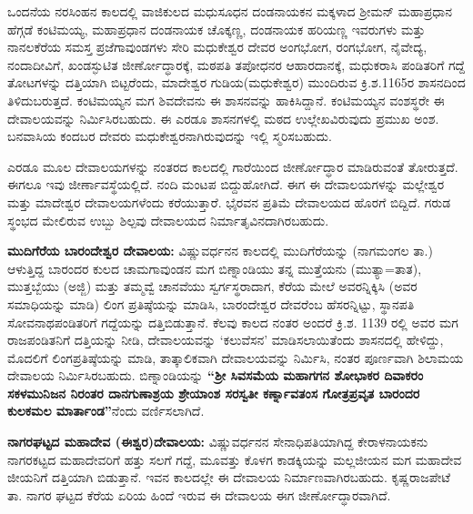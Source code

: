 \vskip 3pt

ಒಂದನೆಯ ನರಸಿಂಹನ ಕಾಲದಲ್ಲಿ ವಾಜಿಕುಲದ ಮಧುಸೂಧನ ದಂಡನಾಯಕನ ಮಕ್ಕಳಾದ ಶ‍್ರೀಮನ್​ ಮಹಾಪ್ರಧಾನ ಹೆಗ್ಗಡೆ ಕಂಟಿಮಯ್ಯ, ಮಹಾಪ್ರಧಾನ ದಂಡನಾಯಕ ಚೊಕ್ಕಣ್ಣ, ದಂಡನಾಯಕ ಹರಿಯಣ್ಣ ಇವರುಗಳು ಮತ್ತು ನಾನಲಕೆರೆಯ ಸಮಸ್ತ ಪ್ರಜೆಗಾವುಂಡಗಳು ಸೇರಿ ಮಧುಕೇಶ್ವರ ದೇವರ ಅಂಗಭೋಗ, ರಂಗಭೋಗ, ನೈವೇದ್ಯ, ನಂದಾದೀವಿಗೆ, ಖಂಡಸ್ಫುಟಿತ ಜೀರ್ಣೋದ್ಧಾರಕ್ಕೆ, ಮಠಪತಿ ತಪೋಧನರ ಆಹಾರದಾನಕ್ಕೆ, ಮಧುಕರಾಸಿ ಪಂಡಿತರಿಗೆ ಗದ್ದೆ ತೋಟಗಳನ್ನು ದತ್ತಿಯಾಗಿ ಬಿಟ್ಟರೆಂದು, ಮಾದೇಶ್ವರ ಗುಡಿಯ(ಮಧುಕೇಶ್ವರ) ಮುಂದಿರುವ ಕ್ರಿ.ಶ.1165ರ ಶಾಸನದಿಂದ ತಿಳಿದುಬರುತ್ತದೆ. ಕಂಟಿಮಯ್ಯನ ಮಗ ಶಿವದೇವನು ಈ ಶಾಸನವನ್ನು ಹಾಕಿಸಿದ್ದಾನೆ. ಕಂಟಿಮಯ್ಯನ ವಂಶಸ್ಥರೇ ಈ ದೇವಾಲಯವನ್ನು ನಿರ್ಮಿಸಿರಬಹುದು. ಈ ಎರಡೂ ಶಾಸನಗಳಲ್ಲಿ ಮಠದ ಉಲ್ಲೇಖವಿರುವುದು ಪ್ರಮುಖ ಅಂಶ. ಬನವಾಸಿಯ ಕಂದಬರ ದೇವರು ಮಧುಕೇಶ್ವರನಾಗಿರುವುದನ್ನು ಇಲ್ಲಿ ಸ್ಮರಿಸಬಹುದು.

\vskip 3pt

ಎರಡೂ ಮೂಲ ದೇವಾಲಯಗಳನ್ನು ನಂತರದ ಕಾಲದಲ್ಲಿ ಗಾರೆಯಿಂದ ಜೀರ್ಣೋದ್ಧಾರ ಮಾಡಿರುವಂತೆ ತೋರುತ್ತದೆ. ಈಗಲೂ ಇವು ಜೀರ್ಣಾವಸ್ಥೆಯಲ್ಲಿದೆ. ನಂದಿ ಮಂಟಪ ಬಿದ್ದುಹೋಗಿದೆ. ಈಗ ಈ ದೇವಾಲಯಗಳನ್ನು ಮಲ್ಲೇಶ್ವರ ಮತ್ತು ಮಾದೇಶ್ವರ ದೇವಾಲಯಗಳೆಂದು ಕರೆಯುತ್ತಾರೆ. ಭೈರವನ ಪ್ರತಿಮೆ ದೇವಾಲಯದ ಹೊರಗೆ ಬಿದ್ದಿದೆ. ಗರುಡ ಸ್ಥಂಭದ ಮೇಲಿರುವ ಉಬ್ಬು ಶಿಲ್ಪವು ದೇವಾಲಯದ ನಿರ್ಮಾತೃವಿನದಾಗಿರಬಹುದು.

\newpage

\textbf{ಮುದಿಗೆರೆಯ ಬಾರಂದೇಶ್ವರ ದೇವಾಲಯ:} ವಿಷ್ಣುವರ್ಧನನ ಕಾಲದಲ್ಲಿ ಮುದಿಗೆರೆಯನ್ನು (ನಾಗಮಂಗಲ ತಾ.) ಆಳುತ್ತಿದ್ದ ಬಾರಂದರ ಕುಲದ ಚಾಮಗಾವುಂಡನ ಮಗ ಬಿಣ್ನಾಂಡಿಯು ತನ್ನ ಮುತ್ತೆಯನು (ಮುತ್ಯಾ=ತಾತ), ಮುತ್ತಬ್ಬೆಯು (ಅಜ್ಜಿ) ಮತ್ತು ತಮ್ಮವ್ವೆ ಚಾನವೆಯು ಸ್ವರ್ಗಸ್ಥರಾದಾಗ, ಕೆರೆಯ ಮೇಲೆ ಅವರನ್ನಿಕ್ಕಿಸಿ (ಅವರ ಸಮಾಧಿಯನ್ನು ಮಾಡಿ) ಲಿಂಗ ಪ್ರತಿಷ್ಠೆಯನ್ನು ಮಾಡಿಸಿ, ಬಾರಂದೇಶ್ವರ ದೇವರೆಂಬ ಹೆಸರನ್ನಿಟ್ಟು, ಸ್ಥಾನಪತಿ ಸೋವನಾಥಪಂಡಿತರಿಗೆ ಗದ್ದೆಯನ್ನು ದತ್ತಿಬಿಡುತ್ತಾನೆ. ಕೆಲವು ಕಾಲದ ನಂತರ ಅಂದರೆ ಕ್ರಿ.ಶ. 1139 ರಲ್ಲಿ ಅವರ ಮಗ ರಾಜಪಂಡಿತನಿಗೆ ದತ್ತಿಯನ್ನು ನೀಡಿ, ದೇವಾಲಯವನ್ನು ‘ಕಲುವೆಸನ’ ಮಾಡಿಸಲಾಯಿತೆಂದು ಶಾಸನದಲ್ಲಿ ಹೇಳಿದ್ದು, ಮೊದಲಿಗೆ ಲಿಂಗಪ್ರತಿಷ್ಠೆಯನ್ನು ಮಾಡಿ, ತಾತ್ಕಾಲಿಕವಾಗಿ ದೇವಾಲಯವನ್ನು ನಿರ್ಮಿಸಿ, ನಂತರ ಪೂರ್ಣವಾಗಿ ಶಿಲಾಮಯ ದೇವಾಲಯ ನಿರ್ಮಿಸಿರಬಹುದು. ಬಿಣ್ನಾಂಡಿಯನ್ನು \textbf{“ಶ‍್ರೀ ಸಿವಸಮೆಯ ಮಹಾಗಗನ ಶೋಭಾಕರ ದಿವಾಕರಂ ಸಕಳಮುನಿಜನ ನಿರಂತರ ದಾನಗುಣಾಶ್ರಯ ಶ್ರೇಯಾಂಶ ಸರಸ್ವತೀ ಕರ್ಣ್ನಾವತಂಸ ಗೋತ್ರಪ್ರವೃತ ಬಾರಂದರ ಕುಲಕಮಲ ಮಾರ್ತಾಂಡ”}ನೆಂದು ವರ್ಣಿಸಲಾಗಿದೆ.

\textbf{ನಾಗರಘಟ್ಟದ ಮಹಾದೇವ (ಈಶ್ವರ)ದೇವಾಲಯ:} ವಿಷ್ಣುವರ್ಧನನ ಸೇನಾಧಿಪತಿಯಾಗಿದ್ದ ಕೇರಾಳನಾಯಕನು ನಾಗರಕಟ್ಟದ ಮಹಾದೇವರಿಗೆ ಹತ್ತು ಸಲಗೆ ಗದ್ದೆ, ಮೂವತ್ತು ಕೊಳಗ ಕಾಡಕ್ಕಿಯನ್ನು ಮಲ್ಲಜೀಯನ ಮಗ ಮಹಾದೇವ ಜೀಯನಿಗೆ ದತ್ತಿಯಾಗಿ ಬಿಡುತ್ತಾನೆ. ಇವನ ಕಾಲದಲ್ಲೇ ಈ ದೇವಾಲಯ ನಿರ್ಮಾಣವಾಗಿರಬಹುದು. ಕೃಷ್ಣರಾಜಪೇಟೆ ತಾ. ನಾಗರ ಘಟ್ಟದ ಕೆರೆಯ ಏರಿಯ ಹಿಂದೆ ಇರುವ ಈ ದೇವಾಲಯ ಈಗ ಜೀರ್ಣೋದ್ಧಾರವಾಗಿದೆ.

